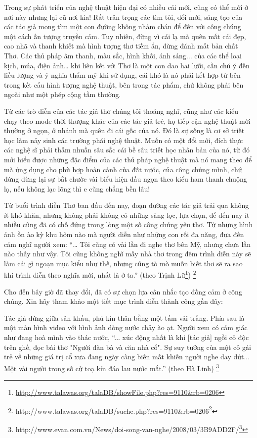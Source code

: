 \documentclass[../main.tex]{subfiles}
\begin{document}
\begin{multicols}{2}
Trong sự phát triển của nghệ thuật hiện đại có nhiều cái mới, cũng có thể mới ở nơi này nhưng lại cũ nơi kia! Rất trân trọng các tìm tòi, đổi mới, sáng tạo của các tác giả mong tìm một con đường không nhàm chán để đến với công chúng một cách ấn tượng truyền cảm. Tuy nhiên, đừng vì cái lạ mà quên mất cái đẹp, cao nhã và thanh khiết mà hình tượng thơ tiềm ẩn, đừng đánh mất bản chất Thơ. Các thủ pháp âm thanh, màu sắc, hình khối, ánh sáng... của các thể loại kịch, múa, điện ảnh… khi liên kết với Thơ là một con dao hai lưỡi, cần chú ý đến liều lượng và ý nghĩa thẩm mỹ khi sử dụng, cái khó là nó phải kết hợp từ bên trong kết cấu hình tượng nghệ thuật, bên trong tác phẩm, chứ không phải bên ngoài như một phép cộng tầm thường. 
 
Từ các trò diễn của các tác giả thơ chúng tôi thoáng nghĩ, cũng như các kiểu chạy theo mode thời thượng khác của các tác giả trẻ, họ tiếp cận nghệ thuật mới thường ở ngọn, ở nhánh mà quên đi cái gốc của nó. Đó là sự sống là cơ sở triết học làm nảy sinh các trường phái nghệ thuật. Muốn có một đổi mới, đích thực các nghệ sĩ phải thấm nhuần sâu sắc cái bề sâu triết học nhân bản của nó, từ đó mới hiểu được những đặc điểm của các thủ pháp nghệ thuật mà nó mang theo để mà ứng dụng cho phù hợp hoàn cảnh của đất nước, của công chúng mình, chứ đừng dừng lại sự bắt chước vài biểu hiện đầu ngọn theo kiểu ham thanh chuộng lạ, nếu không lạc lõng thì e cũng chẳng bền lâu! 
 
Từ buổi trình diễn Thơ ban đầu đến nay, đoạn đường các tác giả trải qua không ít khó khăn, nhưng không phải không có những sàng lọc, lựa chọn, để đến nay ít nhiều cũng đã có chỗ đứng trong lòng một số công chúng yêu thơ. Từ những hình ảnh ồn ào kỳ khu hôm nào mà người diễn như những con rối đa năng, đưa đến cảm nghĩ người xem: “… Tôi cũng có vài lần đi nghe thơ bên Mỹ, nhưng chưa lần nào thấy như vậy. Tôi cũng không nghĩ mấy nhà thơ trong đêm trình diễn này sẽ làm cái gì ngoạn mục kiểu như thế, nhưng cũng tò mò muốn biết thơ sẽ ra sao khi trình diễn theo nghĩa mới, nhất là ở ta.” (theo Trịnh Lữ\footnote{\url{http://www.talawas.org/talaDB/showFile.php?res=9110&rb=0206}}) \footnote{
http://www.talawas.org/talaDB/suche.php?res=9110&rb=0206\footnote{\url{http://www.talawas.org/talaDB/../talaDB/suche.php?res=9110&rb=0206}}}  
 
Cho đến bây giờ đã thay đổi, đã có sự chọn lựa cân nhắc tạo đồng cảm ở công chúng. Xin hãy tham khảo một tiết mục trình diễn thành công gần đây: 
 
Tác giả đứng giữa sân khấu, phủ kín thân bằng một tấm vải trắng. Phía sau là một màn hình video với hình ảnh dòng nước chảy ào ạt. Người xem có cảm giác như đang hoà mình vào thác nước, “... xúc động nhất là khi [tác giả] ngồi cô độc trên ghế, đọc bài thơ "Người đàn bà và căn nhà cổ". Sự suy tưởng của một cô gái trẻ về những giá trị cổ xưa đang ngày càng biến mất khiến người nghe day dứt... Một vài người trong số cử toạ kín đáo lau nước mắt.” (theo Hà Linh) \footnote{
http://www.evan.com.vn/News/doi-song-van-nghe/2008/03/3B9ADD2F/\footnote{\url{http://www.talawas.org/talaDB/http://www.evan.com.vn/News/doi-song-van-nghe/2008/03/3B9ADD2F/}}}  
 

\end{multicols}
\end{document}
